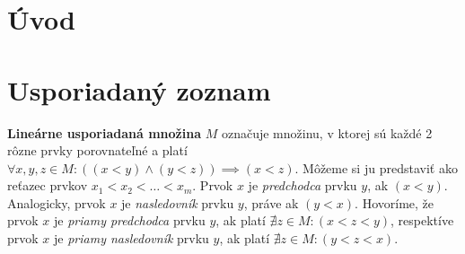 \documentclass[
  digital,     %
  oneside,     %
  nosansbold,  %
  nocolorbold, %
  lof,         %
  lot,         %
]{fithesis4}
\begin{document}

\chapter*{Úvod}

\chapter{Usporiadaný zoznam}

\textbf{Lineárne usporiadaná množina} $M$ označuje množinu, v ktorej sú každé 2 rôzne prvky porovnateľné a platí $\forall x, y, z \in M : ((x < y) \land (y < z)) \implies (x < z)$. Môžeme si ju predstaviť ako reťazec prvkov $x_1 < x_2 < \ldots < x_m$. Prvok $x$ je \emph{predchodca} prvku $y$, ak $(x < y)$. Analogicky, prvok $x$ je \emph{nasledovník} prvku $y$, práve ak $(y < x)$.
Hovoríme, že prvok $x$ je \emph{priamy predchodca} prvku $y$, ak platí $\nexists z \in M: (x < z < y)$, respektíve prvok $x$ je \emph{priamy nasledovník} prvku $y$, ak platí $\nexists z \in M: (y < z < x)$.\\
\end{document}
